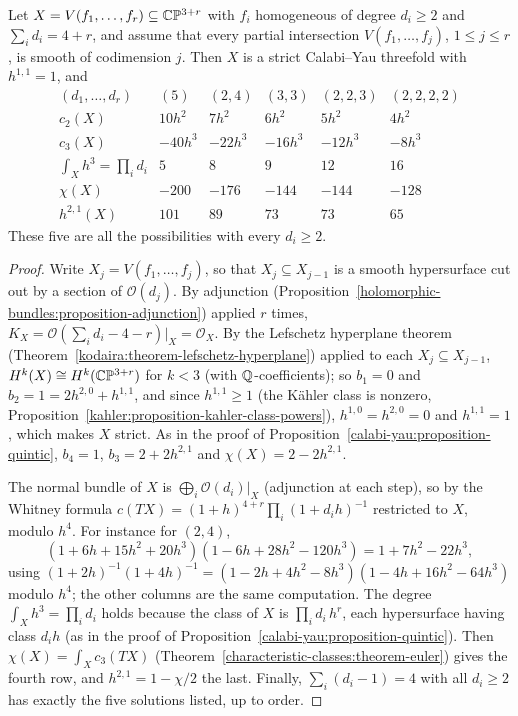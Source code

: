 \begin{proposition}\label{calabi-yau:proposition-complete-intersections}
Let $X = V(f_1, \ldots, f_r) \subseteq \mathbb{C}\mathbb{P}^{3+r}$ with $f_i$ homogeneous of degree $d_i \geq 2$ and $\sum_id_i = 4 + r$, and assume that every partial intersection $V(f_1, \ldots, f_j)$, $1 \leq j \leq r$, is smooth of
codimension $j$. Then $X$ is a strict Calabi--Yau threefold with $h^{1,1} = 1$, and
\[
\begin{array}{c|ccccc}
(d_1, \ldots, d_r) & (5) & (2, 4) & (3, 3) & (2, 2, 3) & (2, 2, 2, 2) \\ \hline
c_2(X) & 10h^2 & 7h^2 & 6h^2 & 5h^2 & 4h^2 \\
c_3(X) & -40h^3 & -22h^3 & -16h^3 & -12h^3 & -8h^3 \\
\int_Xh^3 = \prod_id_i & 5 & 8 & 9 & 12 & 16 \\
\chi(X) & -200 & -176 & -144 & -144 & -128 \\
h^{2,1}(X) & 101 & 89 & 73 & 73 & 65
\end{array}
\]
These five are all the possibilities with every $d_i \geq 2$.
\end{proposition}

\begin{proof}
Write $X_j = V(f_1, \ldots, f_j)$, so that $X_j \subseteq X_{j-1}$ is a smooth hypersurface cut out by a section of $\mathcal{O}(d_j)$. By adjunction (Proposition~\ref{holomorphic-bundles:proposition-adjunction}) applied
$r$ times, $K_X = \mathcal{O}(\sum_id_i - 4 - r)|_X = \mathcal{O}_X$. By the Lefschetz hyperplane theorem (Theorem~\ref{kodaira:theorem-lefschetz-hyperplane}) applied to each $X_j \subseteq X_{j-1}$, $H^k(X) \cong H^k(\mathbb{C}\mathbb{P}^{3+r})$
for $k < 3$ (with $\mathbb{Q}$-coefficients); so $b_1 = 0$ and $b_2 = 1 = 2h^{2,0} + h^{1,1}$, and since $h^{1,1} \geq 1$ (the K\"ahler class is nonzero,
Proposition~\ref{kahler:proposition-kahler-class-powers}), $h^{1,0} = h^{2,0} = 0$ and $h^{1,1} = 1$, which makes $X$ strict. As in the proof of Proposition~\ref{calabi-yau:proposition-quintic}, $b_4 = 1$, $b_3 = 2 + 2h^{2,1}$ and
$\chi(X) = 2 - 2h^{2,1}$.

The normal bundle of $X$ is $\bigoplus_i\mathcal{O}(d_i)|_X$ (adjunction at each step), so by the Whitney formula $c(TX) = (1 + h)^{4+r}\prod_i(1 + d_ih)^{-1}$ restricted to $X$, modulo $h^4$. For instance for $(2, 4)$,
\[
(1 + 6h + 15h^2 + 20h^3)(1 - 6h + 28h^2 - 120h^3) = 1 + 7h^2 - 22h^3,
\]
using $(1 + 2h)^{-1}(1 + 4h)^{-1} = (1 - 2h + 4h^2 - 8h^3)(1 - 4h + 16h^2 - 64h^3)$ modulo $h^4$; the other columns are the same computation. The degree $\int_Xh^3 = \prod_id_i$ holds because the class of $X$ is
$\prod_id_i\,h^r$, each hypersurface having class $d_ih$ (as in the proof of Proposition~\ref{calabi-yau:proposition-quintic}). Then $\chi(X) = \int_Xc_3(TX)$ (Theorem~\ref{characteristic-classes:theorem-euler}) gives
the fourth row, and $h^{2,1} = 1 - \chi/2$ the last. Finally, $\sum_i(d_i - 1) = 4$ with all $d_i \geq 2$ has exactly the five solutions listed, up to order.
\end{proof}

